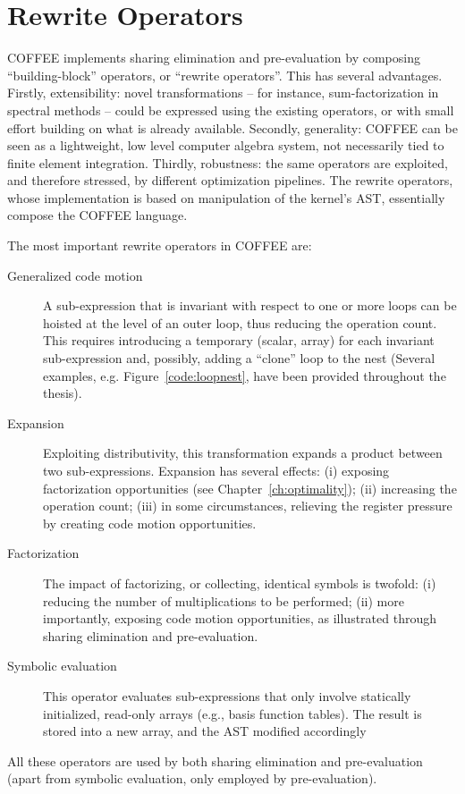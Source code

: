 \section{Rewrite Operators}
\label{sec:coffee:rewrite-ops}
COFFEE implements sharing elimination and pre-evaluation by composing ``building-block'' operators, or ``rewrite operators''. This has several advantages. Firstly, extensibility: novel transformations -- for instance, sum-factorization in spectral methods -- could be expressed using the existing operators, or with small effort building on what is already available. Secondly, generality: COFFEE can be seen as a lightweight, low level computer algebra system, not necessarily tied to finite element integration. Thirdly, robustness: the same operators are exploited, and therefore stressed, by different optimization pipelines. The rewrite operators, whose implementation is based on manipulation of the kernel's AST, essentially compose the COFFEE language. 

The most important rewrite operators in COFFEE are:
\begin{description}
\item[Generalized code motion] A sub-expression that is invariant with respect to one or more loops can be hoisted at the level of an outer loop, thus reducing the operation count. This requires introducing a temporary (scalar, array) for each invariant sub-expression and, possibly, adding a ``clone'' loop to the nest (Several examples, e.g. Figure~\ref{code:loopnest}, have been provided throughout the thesis). 
\item[Expansion] Exploiting distributivity, this transformation expands a product between two sub-expressions. Expansion has several effects: (i) exposing factorization opportunities (see Chapter~\ref{ch:optimality}); (ii) increasing the operation count; (iii) in some circumstances, relieving the register pressure by creating code motion opportunities.
\item[Factorization] The impact of factorizing, or collecting, identical symbols is twofold: (i) reducing the number of multiplications to be performed; (ii) more importantly, exposing code motion opportunities, as illustrated through sharing elimination and pre-evaluation.
\item[Symbolic evaluation] This operator evaluates sub-expressions that only involve statically initialized, read-only arrays (e.g., basis function tables). The result is stored into a new array, and the AST modified accordingly
\end{description}
All these operators are used by both sharing elimination and pre-evaluation (apart from symbolic evaluation, only employed by pre-evaluation).

